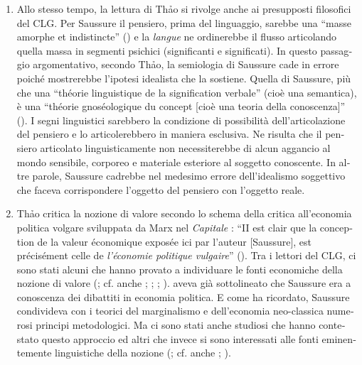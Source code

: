 \documentclass[output=paper]{../langscibook}
\begin{document}
\begin{otherlanguage}{italian}
\begin{enumerate}
\item Allo stesso tempo, la lettura di Th\textlatin{ả}o si rivolge anche ai presupposti filosofici del CLG. Per Saussure il pensiero, prima del linguaggio, sarebbe una “masse amorphe et indistincte” (\citealt[155]{saussure_cours_1995}) e la \textit{langue} ne ordinerebbe il flusso articolando quella massa in segmenti psichici (significanti e significati). In questo passaggio argomentativo, secondo Th\textlatin{ả}o, la semiologia di Saussure cade in errore poiché mostrerebbe l’ipotesi idealista che la sostiene. Quella di Saussure, più che una “théorie linguistique de la signification verbale” (cioè una semantica), è una “théorie gnoséologique du concept [cioè una teoria della conoscenza]” (\citealt[41]{thao_phenomenologie_1974}). I segni linguistici sarebbero la condizione di possibilità dell’articolazione del pensiero e lo articolerebbero in maniera esclusiva. Ne risulta che il pensiero articolato linguisticamente non necessiterebbe di alcun aggancio al mondo sensibile, corporeo e materiale esteriore al soggetto conoscente. In altre parole, Saussure cadrebbe nel medesimo errore dell’idealismo soggettivo che faceva corrispondere l’oggetto del pensiero con l’oggetto reale.

\item Th\textlatin{ả}o critica la nozione di valore secondo lo schema della critica all’economia politica volgare sviluppata da Marx nel \textit{Capitale} \citep{marx_kapital._1867}: “II est clair que la conception de la valeur économique exposée ici par l’auteur [Saussure], est précisément celle de \textit{l’économie politique vulgaire}” (\citealt[42]{thao_phenomenologie_1974}). Tra i lettori del CLG, ci sono stati alcuni che hanno provato a individuare le fonti economiche della nozione di valore (\citealt[68]{koerner_ferdinand_1973}; cf. anche \citealt[541]{sljusareva_notion_1980}; \citealt[2]{ponzio_valeur_2005}; \citealt{ponzio_linguistica_2015}; \citealt{joseph_saussures_2014}). \citet[n. 165]{de_mauro_note_2011} aveva già sottolineato che Saussure era a conoscenza dei dibattiti in economia politica. E come \citet{ponzio_valeur_2005} ha ricordato, Saussure condivideva con i teorici del marginalismo e dell’economia neo-classica numerosi principi metodologici. Ma ci sono stati anche studiosi che hanno contestato questo approccio \citep[235]{godel_les_1957} ed altri che invece si sono interessati alle fonti eminentemente linguistiche della nozione (\citealt[295]{auroux_deux_1985}; cf. anche \citealt[329]{swiggers_girard_1982}; \citealt{hasler_notion_2007}).


\end{enumerate}
\end{otherlanguage}
\end{document}
